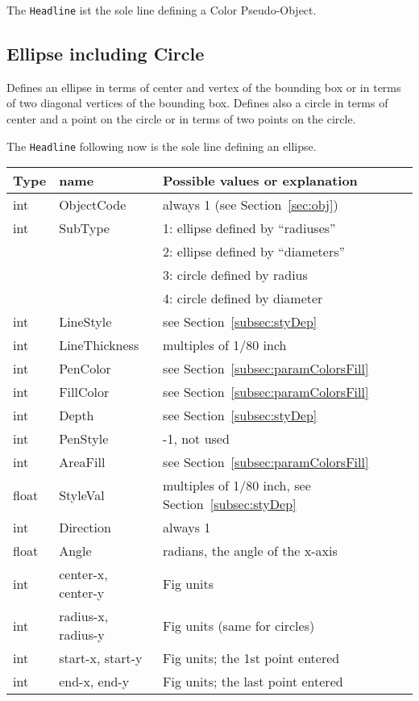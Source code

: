 \documentclass[10pt, a4paper]{article}%
\begin{document}
The \texttt{Headline} ist the sole line defining a Color Pseudo-Object. 


\subsection{Ellipse including Circle}\label{subsec:ellipse}

Defines an ellipse in terms of center and vertex of the bounding box 
or in terms of two diagonal vertices of the bounding box. 
Defines also a circle in terms of center and a point on the circle 
or in terms of two points on the circle. 

\noindent
The \texttt{Headline} following now is the sole line defining an ellipse. \\
%
\begin{tabular}{lll}
\toprule
Type  & name                & Possible values or explanation \\
\midrule
\midrule
int   &  ObjectCode         & always 1 (see Section~\ref{sec:obj}) \\
int   &  SubType            & 1: ellipse defined by ``radiuses'' \\
&&                            2: ellipse defined by ``diameters'' \\
&&                            3: circle defined by radius \\
&&                            4: circle defined by diameter \\
int   &  LineStyle          & see Section~\ref{subsec:styDep} \\
int   &  LineThickness      & multiples of 1/80 inch \\
int   &  PenColor           & see Section~\ref{subsec:paramColorsFill} \\
int   &  FillColor          & see Section~\ref{subsec:paramColorsFill} \\
int   &  Depth              & see Section~\ref{subsec:styDep} \\
int   &  PenStyle           & -1, not used \\
int   &  AreaFill           & see Section~\ref{subsec:paramColorsFill} \\
float &  StyleVal           & multiples of 1/80 inch, 
                              see Section~\ref{subsec:styDep}  \\
int   &  Direction          & always 1 \\
float &  Angle              & radians, the angle of the x-axis \\
int   &  center-x, center-y & Fig units \\
int   &  radius-x, radius-y & Fig units (same for circles) \\
int   &  start-x, start-y   & Fig units; the 1st point entered \\
int   &  end-x, end-y       & Fig units; the last point entered \\
\bottomrule
\end{tabular}
\end{document}
